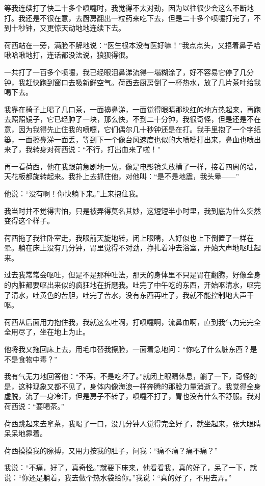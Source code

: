 \par 等我连续打了快二十多个喷嚏时，我觉得不太对劲，因为以往很少会这么不断地打。我还是不很在意，去厨房翻出一粒药来吃下去，但是二十多个喷嚏打完了，不到十秒钟，又更惊天动地地连续下去。
\par 荷西站在一旁，满脸不解地说：“医生根本没有医好嘛！”我点点头，又捂着鼻子哈啾哈啾地打，连话都没法说，狼狈得很。
\par 一共打了一百多个喷嚏，我已经眼泪鼻涕流得一塌糊涂了，好不容易它停了几分钟，我赶快跑到窗口去吸新鲜空气。荷西去厨房倒了一杯热水，放了几片茶叶给我喝下去。
\par 我靠在椅子上喝了几口茶，一面擤鼻涕，一面觉得眼睛那块红的地方热起来，再跑去照照镜子，它已经肿了一块，那么快，不到二十分钟，我很奇怪，但是还是不在意，因为我得先止住我的喷嚏，它们偶尔几十秒钟还是在打。我手里抱了一个字纸篓，一面擦鼻涕一面丢，等到下一个像台风速度也似的大喷嚏打出来，鼻血也喷出来了，我转身对荷西说：“不行，打出血来了啦！”
\par 再一看荷西，他在我跟前急剧地一晃，像是电影镜头放横了一样，接着四周的墙，天花板都旋转起来。我扑上去抓住他，对他叫：“是不是地震，我头晕——”
\par 他说：“没有啊！你快躺下来。”上来抱住我。
\par 我当时并不觉得害怕，只是被弄得莫名其妙，这短短半小时里，我到底为什么突然变得这个样子。
\par 荷西拖了我往卧室走，我眼前天旋地转，闭上眼睛，人好似也上下倒置了一样在晕。躺在床上没有几分钟，胃里觉得不对劲，挣扎着冲去浴室，开始大声地呕吐起来。
\par 过去我常常会呕吐，但是不是那种吐法，那天的身体里不只是胃在翻腾，好像全身的内脏都要呕出来似的疯狂地在折磨我。吐完了中午吃的东西，开始呕清水，呕完了清水，吐黄色的苦胆，吐完了苦水，没有东西再吐了，我就不能控制地大声干呕。
\par 荷西从后面用力抱住我，我就这么吐啊，打喷嚏啊，流鼻血啊，直到我气力完完全全用尽了，坐在地上为止。
\par 他将我又拖回床上去，用毛巾替我擦脸，一面着急地问：“你吃了什么脏东西？是不是食物中毒？”
\par 我有气无力地回答他：“不泻，不是吃坏了。”就闭上眼睛休息，躺了一下，奇怪的是，这种现象又都不见了，身体内像海浪一样奔腾的那股力量消逝了。我觉得全身虚脱，流了一身冷汗，但是房子不转了，喷嚏不打了，胃也没有什么不舒服。我对荷西说：“要喝茶。”
\par 荷西跳起来去拿茶，我喝了一口，没几分钟人觉得完全好了，就坐起来，张大眼睛呆呆地靠着。
\par 荷西摸摸我的脉搏，又用力按我的肚子，问我：“痛不痛？痛不痛？”
\par 我说：“不痛，好了，真奇怪。”就要下床来，他看看我，真的好了，呆了一下，就说：“你还是躺着，我去做个热水袋给你。”我说：“真的好了，不用去弄。”
